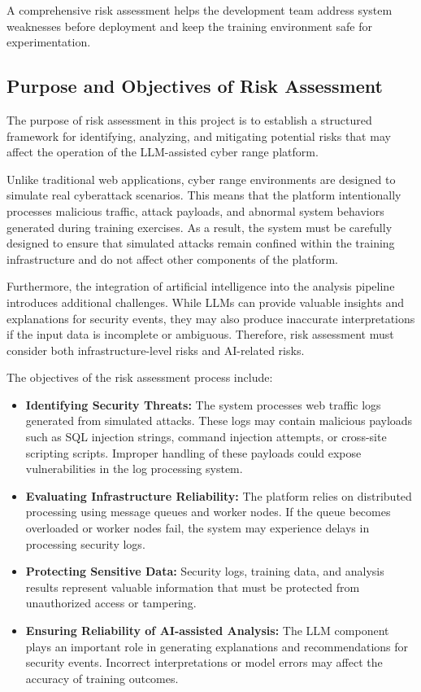A comprehensive risk assessment helps the development team address system weaknesses before deployment and keep the training environment safe for experimentation.

\subsection{Purpose and Objectives of Risk Assessment}
The purpose of risk assessment in this project is to establish a structured framework for identifying, analyzing, and mitigating potential risks that may affect the operation of the LLM-assisted cyber range platform.

Unlike traditional web applications, cyber range environments are designed to simulate real cyberattack scenarios. This means that the platform intentionally processes malicious traffic, attack payloads, and abnormal system behaviors generated during training exercises. As a result, the system must be carefully designed to ensure that simulated attacks remain confined within the training infrastructure and do not affect other components of the platform.

Furthermore, the integration of artificial intelligence into the analysis pipeline introduces additional challenges. While LLMs can provide valuable insights and explanations for security events, they may also produce inaccurate interpretations if the input data is incomplete or ambiguous. Therefore, risk assessment must consider both infrastructure-level risks and AI-related risks.

The objectives of the risk assessment process include:

\begin{itemize}
    \item \textbf{Identifying Security Threats:} The system processes web traffic logs generated from simulated attacks. These logs may contain malicious payloads such as SQL injection strings, command injection attempts, or cross-site scripting scripts. Improper handling of these payloads could expose vulnerabilities in the log processing system.

    \item \textbf{Evaluating Infrastructure Reliability:} The platform relies on distributed processing using message queues and worker nodes. If the queue becomes overloaded or worker nodes fail, the system may experience delays in processing security logs.

    \item \textbf{Protecting Sensitive Data:} Security logs, training data, and analysis results represent valuable information that must be protected from unauthorized access or tampering.

    \item \textbf{Ensuring Reliability of AI-assisted Analysis:} The LLM component plays an important role in generating explanations and recommendations for security events. Incorrect interpretations or model errors may affect the accuracy of training outcomes.
\end{itemize}

